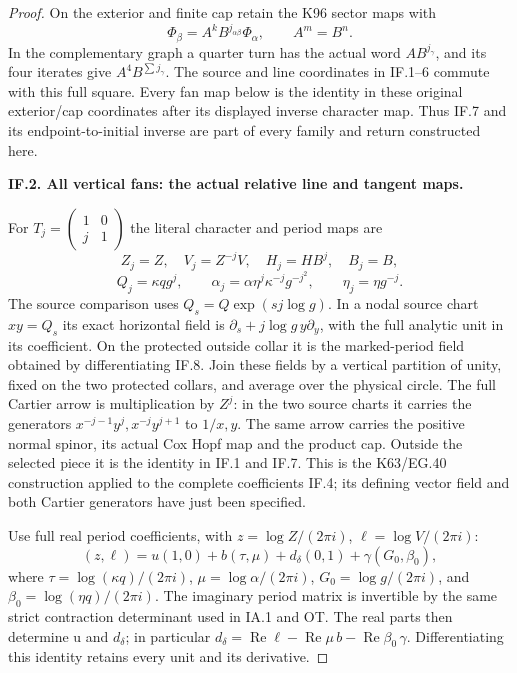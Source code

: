 \begin{proof}
On the exterior and finite cap retain the K96 sector maps with
\[
 \Phi_\beta=A^kB^{j_{\alpha\beta}}\Phi_\alpha,\qquad A^m=B^n.
 \tag{IF.7}
\]
In the complementary graph a quarter turn has the actual word
\(AB^{j_\gamma}\), and its four iterates give
\(A^4B^{\sum j_\gamma}\).  The source and line coordinates in
IF.1--6 commute with this full square.  Every fan map below is the
identity in these original exterior/cap coordinates after its displayed
inverse character map.  Thus IF.7 and its endpoint-to-initial inverse
are part of every family and return constructed here.

\par\medskip\noindent\textbf{IF.2. All vertical fans: the actual relative line and tangent maps.}\par\nopagebreak[4]

For \(T_j=\left(\begin{smallmatrix}1&0\\j&1\end{smallmatrix}\right)\)
the literal character and period maps are
\[
 Z_j=Z,\quad V_j=Z^{-j}V,\quad H_j=HB^j,\quad B_j=B,
\]
\[
 Q_j=\kappa qg^j,\qquad
 \alpha_j=\alpha\eta^j\kappa^{-j}g^{-j^2},\qquad
 \eta_j=\eta g^{-j}.
 \tag{IF.8}
\]
The source comparison uses \(Q_s=Q\exp(sj\log g)\).  In a
nodal source chart \(xy=Q_s\) its exact horizontal field is
\(\partial_s+j\log g\,y\partial_y\), with the full analytic
unit in its coefficient.  On the protected outside collar it is the
marked-period field obtained by differentiating IF.8.  Join these
fields by a vertical partition of unity, fixed on the two protected
collars, and average over the physical circle.  The full Cartier arrow
is multiplication by \(Z^j\): in the two source charts it carries
the generators \(x^{-j-1}y^j,x^{-j}y^{j+1}\) to \(1/x,y\).
The same arrow carries the positive normal spinor, its actual Cox
Hopf map and the product cap.  Outside the selected piece it is the
identity in IF.1 and IF.7.  This is the K63/EG.40 construction applied
to the complete coefficients IF.4; its defining vector field and both
Cartier generators have just been specified.

Use full real period coefficients, with \(z=\log Z/(2\pi i)\),
\(\ell=\log V/(2\pi i)\):
\[
 (z,\ell)=u(1,0)+b(\tau,\mu)+d_\delta(0,1)
                         +\gamma(G_0,\beta_0),
 \tag{IF.9}
\]
where \(\tau=\log(\kappa q)/(2\pi i)\),
\(\mu=\log\alpha/(2\pi i)\),
\(G_0=\log g/(2\pi i)\), and
\(\beta_0=\log(\eta q)/(2\pi i)\).  The imaginary period
matrix is invertible by the same strict contraction determinant used
in IA.1 and OT.  The real parts then determine u and \(d_\delta\); in
particular \(d_\delta=\operatorname{Re}\ell-\operatorname{Re}\mu\,b
-\operatorname{Re}\beta_0\,\gamma\).  Differentiating this
identity retains every unit and its derivative.


\end{proof}
